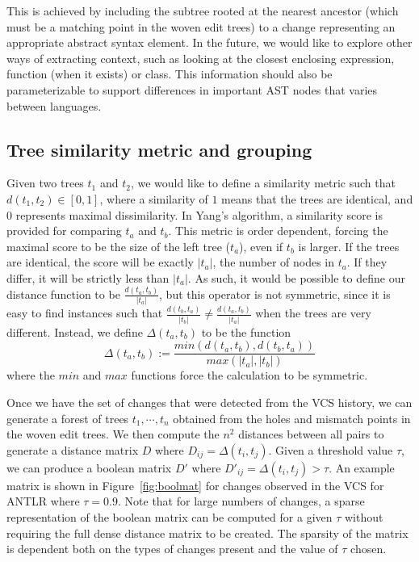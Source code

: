 This is achieved by including the subtree rooted at the nearest ancestor
(which must be a matching point in the woven edit trees) to a change
representing an appropriate abstract syntax element.   In the future, we would
like to explore other ways of extracting context, such as looking at the
closest enclosing expression, function (when it exists) or class.  This
information should also be parameterizable to support differences in important
AST nodes that varies between languages.

\subsection{Tree similarity metric and grouping}

Given two trees $t_1$ and $t_2$, we would like to define a similarity metric
such that $d(t_1, t_2) \in [0,1]$, where a similarity of $1$ means that the
trees are identical, and $0$ represents maximal dissimilarity.  In Yang's
algorithm, a similarity score is provided for comparing $t_a$ and $t_b$. This
metric is order dependent, forcing the maximal score to be the size of the
left tree ($t_a$), even if $t_b$ is larger.  If the trees are identical, the
score will be exactly $|t_a|$, the number of nodes in $t_a$.  If they differ,
it will be strictly less than $|t_a|$.  As such, it would be possible to define
our distance function to be $\frac{d(t_a, t_b)}{|t_a|}$, but this operator is
not symmetric, since it is easy to find instances such that $\frac{d(t_b,
t_a)}{|t_b|} \neq \frac{d(t_a, t_b)}{|t_a|}$ when the trees are very different.
Instead, we define $\Delta(t_a, t_b)$ to be the function
$$\Delta(t_a, t_b) := \frac{min(d(t_a, t_b),d(t_b, t_a))}{max(|t_a|,|t_b|)}$$
where the $min$ and $max$ functions force the calculation to be symmetric.

Once we have the set of changes that were detected from the VCS history, we
can generate a forest of trees $t_1, \cdots, t_n$ obtained from the holes and
mismatch points in the woven edit trees.  We then compute the $n^2$ distances
between all pairs to generate a distance matrix $D$ where $D_{ij} =
\Delta(t_i, t_j)$.  Given a threshold value $\tau$, we can produce a boolean
matrix $D'$ where $D'_{ij} = \Delta(t_i, t_j) > \tau$.  An example matrix is
shown in Figure~\ref{fig:boolmat} for changes observed in the VCS for ANTLR
where $\tau = 0.9$.  Note that for large numbers of changes, a sparse
representation of the boolean matrix can be computed for a given $\tau$
without requiring the full dense distance matrix to be created.  The sparsity
of the matrix is dependent both on the types of changes present and the value
of $\tau$ chosen.  

